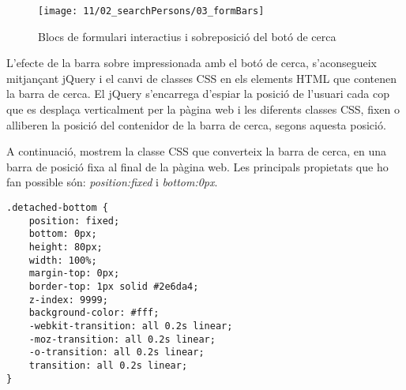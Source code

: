\begin{figure}[h]
    \texttt{[image: 11/02\_searchPersons/03\_formBars]}
    \centering
    \caption{Blocs de formulari interactius i sobreposició del botó de cerca}\label{fig:interactiveFormBloc}
\end{figure}

L'efecte de la barra sobre impressionada amb el botó de cerca, s'aconsegueix mitjançant jQuery i el canvi de classes CSS en els elements HTML que contenen la barra de cerca. El jQuery s'encarrega d'espiar la posició de l'usuari cada cop que es desplaça verticalment per la pàgina web i les diferents classes CSS, fixen o alliberen la posició del contenidor de la barra de cerca, segons aquesta posició.

A continuació, mostrem la classe CSS que converteix la barra de cerca, en una barra de posició fixa al final de la pàgina web. Les principals propietats que ho fan possible són: \emph{position:fixed} i \emph{bottom:0px}.

\begin{lstlisting}[style=rawOwn,caption={Classe CSS per sobre impressionar el botó de cerca}]
.detached-bottom {
    position: fixed;
    bottom: 0px;
    height: 80px;
    width: 100%;
    margin-top: 0px;
    border-top: 1px solid #2e6da4;
    z-index: 9999;
    background-color: #fff;
    -webkit-transition: all 0.2s linear;
    -moz-transition: all 0.2s linear;
    -o-transition: all 0.2s linear;
    transition: all 0.2s linear;
}
\end{lstlisting}
